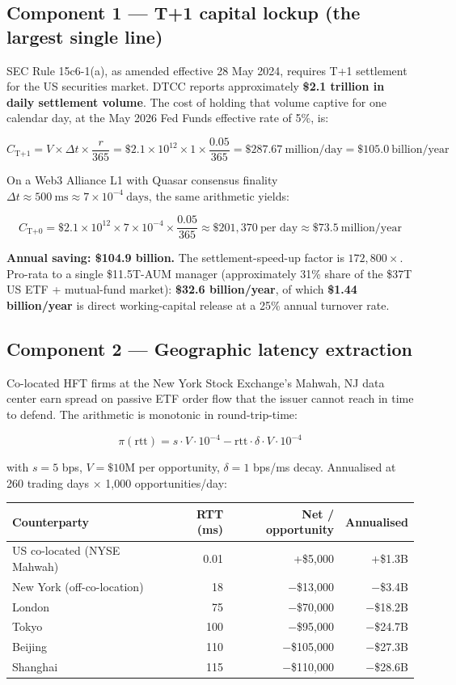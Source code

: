 \subsection{Component 1 --- T+1 capital lockup (the largest single line)}

SEC Rule 15c6-1(a), as amended effective 28 May 2024, requires
T+1 settlement for the US securities market. DTCC reports approximately
\textbf{\$2.1 trillion in daily settlement volume}. The cost of holding
that volume captive for one calendar day, at the May 2026 Fed Funds
effective rate of 5\%, is:

\[
C_{\text{T+1}} = V \times \Delta t \times \frac{r}{365}
= \$2.1 \times 10^{12} \times 1 \times \frac{0.05}{365}
= \$287.67~\text{million/day} = \boxed{\$105.0~\text{billion/year}}
\]

On a Web3 Alliance L1 with Quasar consensus finality $\Delta t \approx
500~\text{ms} \approx 7 \times 10^{-4}~\text{days}$, the same arithmetic
yields:

\[
C_{\text{T+0}} = \$2.1 \times 10^{12} \times 7 \times 10^{-4} \times \frac{0.05}{365}
\approx \$201{,}370~\text{per day} \approx \$73.5~\text{million/year}
\]

\textbf{Annual saving: \$104.9 billion.} The settlement-speed-up factor is
$172{,}800\times$. Pro-rata to a single \$11.5T-AUM manager
(approximately 31\% share of the \$37T US ETF + mutual-fund market):
\textbf{\$32.6 billion/year}, of which \textbf{\$1.44 billion/year}
is direct working-capital release at a 25\% annual turnover rate.

\subsection{Component 2 --- Geographic latency extraction}

Co-located HFT firms at the New York Stock Exchange's Mahwah,
NJ data center earn spread on passive ETF order flow that the issuer
cannot reach in time to defend. The arithmetic is monotonic in
round-trip-time:

\[
\pi(\text{rtt}) = s \cdot V \cdot 10^{-4} - \text{rtt} \cdot \delta \cdot V \cdot 10^{-4}
\]

with $s = 5$ bps, $V = \$10$M per opportunity, $\delta = 1$ bps/ms decay.
Annualised at 260 trading days $\times$ 1,000 opportunities/day:

\begin{center}
\small
\begin{tabular}{lrr r}
\toprule
Counterparty & RTT (ms) & Net / opportunity & Annualised \\
\midrule
US co-located (NYSE Mahwah) & 0.01 & +\$5,000 & +\$1.3B \\
New York (off-co-location) & 18 & $-$\$13,000 & $-$\$3.4B \\
London & 75 & $-$\$70,000 & $-$\$18.2B \\
Tokyo & 100 & $-$\$95,000 & $-$\$24.7B \\
Beijing & 110 & $-$\$105,000 & $-$\$27.3B \\
Shanghai & 115 & $-$\$110,000 & $-$\$28.6B \\
\bottomrule
\end{tabular}
\end{center}

